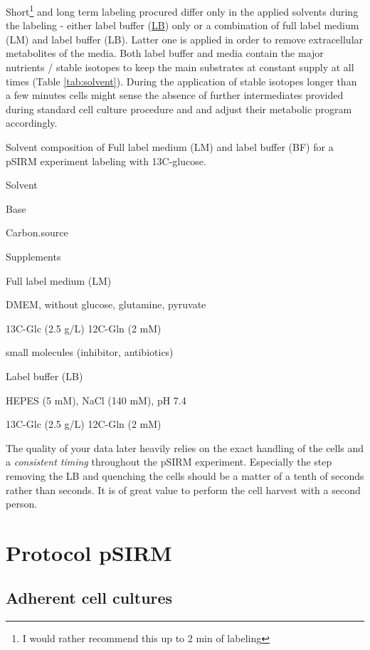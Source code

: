 \documentclass[]{book}
\let\rmarkdownfootnote\footnote%
\def\footnote{\protect\rmarkdownfootnote}
\theoremstyle{definition}
\theoremstyle{definition}
\theoremstyle{definition}
\theoremstyle{remark}
\begin{document}
Short\footnote{I would rather recommend this up to 2 min of labeling}
and long term labeling procured differ only in the applied solvents
during the labeling - either label buffer
(\protect\hyperlink{washingbuffer}{LB}) only or a combination of full
label medium (LM) and label buffer (LB). Latter one is applied in order
to remove extracellular metabolites of the media. Both label buffer and
media contain the major nutrients / stable isotopes to keep the main
substrates at constant supply at all times (Table \ref{tab:solvent}).
During the application of stable isotopes longer than a few minutes
cells might sense the absence of further intermediates provided during
standard cell culture procedure and and adjust their metabolic program
accordingly.

\label{tab:solvent}Solvent composition of Full label medium (LM) and label
buffer (BF) for a pSIRM experiment labeling with 13C-glucose.

Solvent

Base

Carbon.source

Supplements

Full label medium (LM)

DMEM, without glucose, glutamine, pyruvate

13C-Glc (2.5 g/L) 12C-Gln (2 mM)

small molecules (inhibitor, antibiotics)

Label buffer (LB)

HEPES (5 mM), NaCl (140 mM), pH 7.4

13C-Glc (2.5 g/L) 12C-Gln (2 mM)

The quality of your data later heavily relies on the exact handling of
the cells and a \emph{consistent timing} throughout the pSIRM
experiment. Especially the step removing the LB and quenching the cells
should be a matter of a tenth of seconds rather than seconds. It is of
great value to perform the cell harvest with a second person.

\section{Protocol pSIRM}\label{protocol-psirm}

\hypertarget{psirm:adherent}{\subsection{Adherent cell
cultures}\label{psirm:adherent}}
\end{document}
